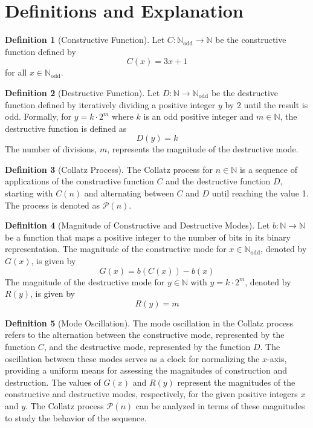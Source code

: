 \documentclass{article}
\theoremstyle{definition}
\newtheorem{definition}{Definition}
\begin{document}
\section{Definitions and Explanation}

\begin{definition}[Constructive Function]
Let \( C \colon \mathbb{N}_{\text{odd}} \to \mathbb{N} \) be the constructive function defined by
\[ C(x) = 3x + 1 \]
for all \( x \in \mathbb{N}_{\text{odd}} \).
\end{definition}

\begin{definition}[Destructive Function]
Let \( D \colon \mathbb{N} \to \mathbb{N}_{\text{odd}} \) be the destructive function defined by iteratively dividing a positive integer \( y \) by 2 until the result is odd. Formally, for \( y = k \cdot 2^m \) where \( k \) is an odd positive integer and \( m \in \mathbb{N} \), the destructive function is defined as
\[ D(y) = k \]
The number of divisions, \( m \), represents the magnitude of the destructive mode.
\end{definition}

\begin{definition}[Collatz Process]
The Collatz process for \( n \in \mathbb{N} \) is a sequence of applications of the constructive function \( C \) and the destructive function \( D \), starting with \( C(n) \) and alternating between \( C \) and \( D \) until reaching the value 1. The process is denoted as \( \mathcal{P}(n) \).
\end{definition}

\begin{definition}[Magnitude of Constructive and Destructive Modes]
Let \( b \colon \mathbb{N} \to \mathbb{N} \) be a function that maps a positive integer to the number of bits in its binary representation. The magnitude of the constructive mode for \( x \in \mathbb{N}_{\text{odd}} \), denoted by \( G(x) \), is given by
\[ G(x) = b(C(x)) - b(x) \]
The magnitude of the destructive mode for \( y \in \mathbb{N} \) with \( y = k \cdot 2^m \), denoted by \( R(y) \), is given by
\[ R(y) = m \]
\end{definition}

\begin{definition}[Mode Oscillation]
The mode oscillation in the Collatz process refers to the alternation between the constructive mode, represented by the function \( C \), and the destructive mode, represented by the function \( D \). The oscillation between these modes serves as a clock for normalizing the \( x \)-axis, providing a uniform means for assessing the magnitudes of construction and destruction. The values of \( G(x) \) and \( R(y) \) represent the magnitudes of the constructive and destructive modes, respectively, for the given positive integers \( x \) and \( y \). The Collatz process \( \mathcal{P}(n) \) can be analyzed in terms of these magnitudes to study the behavior of the sequence.
\end{definition}
\end{document}
